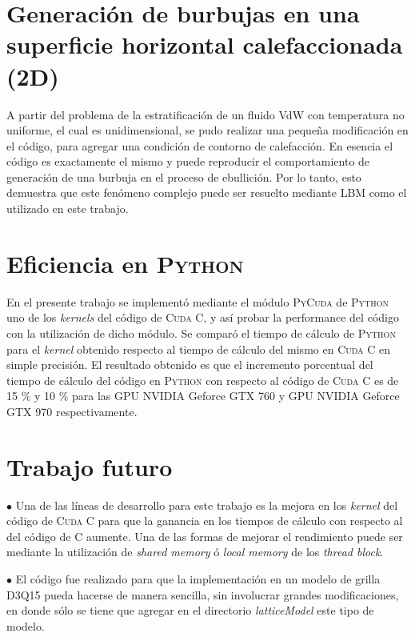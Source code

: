 \section{Generación de burbujas en una superficie horizontal calefaccionada (2D)}

A partir del problema de la estratificación de un fluido VdW con temperatura no uniforme, el cual es unidimensional, se pudo realizar una pequeña modificación en el código, para agregar una condición de contorno de calefacción. En esencia el código es exactamente el mismo y puede reproducir el comportamiento de generación de una burbuja en el proceso de ebullición. Por lo tanto, esto demuestra que este fenómeno complejo puede ser resuelto mediante LBM como el utilizado en este trabajo.

\newpage

\section{Eficiencia en \textsc{Python}}

En el presente trabajo se implementó mediante el módulo \textsc{PyCuda} de \textsc{Python} uno de los \textit{kernels} del código de \textsc{Cuda C}, y así probar la performance del código con la utilización de dicho módulo. Se comparó el tiempo de cálculo de \textsc{Python} para el \textit{kernel} obtenido respecto al tiempo de cálculo del mismo en \textsc{Cuda C} en simple precisión. El resultado obtenido es que el incremento porcentual del tiempo de cálculo del código en \textsc{Python} con respecto al código de \textsc{Cuda C} es de 15 \% y 10 \% para las GPU NVIDIA Geforce GTX 760 y GPU NVIDIA Geforce GTX 970 respectivamente.

\section{Trabajo futuro}

$\bullet$ Una de las líneas de desarrollo para este trabajo es la mejora en los \textit{kernel} del código de \textsc{Cuda C} para que la ganancia en los tiempos de cálculo con respecto al del código de \textsc{C} aumente. Una de las formas de mejorar el rendimiento puede ser mediante la utilización de \textit{shared memory} ó \textit{local memory} de los \textit{thread block}. 

$\bullet$ El código fue realizado para que la implementación en un modelo de grilla D3Q15 pueda hacerse de manera sencilla, sin involucrar grandes modificaciones, en donde sólo se tiene que agregar en el directorio \textit{latticeModel} este tipo de modelo. 


